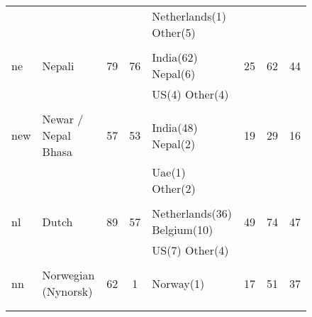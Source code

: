 \begin{figure}[h]
\begin{tabular}{llcclccc}
&&&&Netherlands(1) Other(5) &&&\\
&&&&&&&\\
ne&Nepali&79&76&India(62) Nepal(6) &25&62&44\\
&&&&US(4) Other(4) &&&\\
&&&&&&&\\
new&Newar / Nepal Bhasa&57&53&India(48) Nepal(2) &19&29&16\\
&&&&Uae(1) Other(2) &&&\\
&&&&&&&\\
nl&Dutch&89&57&Netherlands(36) Belgium(10) &49&74&47\\
&&&&US(7) Other(4) &&&\\
&&&&&&&\\
nn&Norwegian (Nynorsk)&62&1&Norway(1) &17&51&37\\
&&&&&&&\\
&&&&&&&\\
\end{tabular}
\end{figure}
\clearpage
